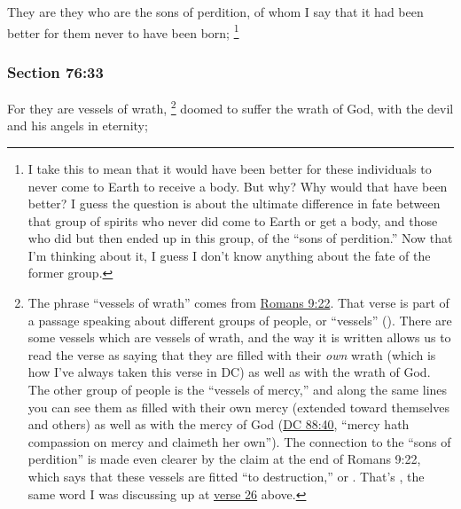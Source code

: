 		They are they who are the sons of perdition, of whom I say that it had been better for them never to have been born;%
		\footnote{%
			I take this to mean that it would have been better for these individuals to never come to Earth to receive a body. But why? Why would that have been better? I guess the question is about the ultimate difference in fate between that group of spirits who never did come to Earth or get a body, and those who did but then ended up in this group, of the ``sons of perdition.'' Now that I'm thinking about it, I guess I don't know anything about the fate of the former group.
			} 


	\subsubsection{Section 76:33} %
		\label{DC76-33}

		For they are vessels of wrath,%
			\footnote{%
				The phrase ``vessels of wrath'' comes from \hyperref[ROMANS-9-22]{Romans 9:22}. That verse is part of a passage speaking about different groups of people, or ``vessels'' (). There are some vessels which are vessels of wrath, and the way it is written allows us to read the verse as saying that they are filled with their \textit{own} wrath (which is how I've always taken this verse in DC) as well as with the wrath of God. The other group of people is the ``vessels of mercy,'' and along the same lines you can see them as filled with their own mercy (extended toward themselves and others) as well as with the mercy of God (\hyperref[DC88-40]{DC 88:40}, ``mercy hath compassion on mercy and claimeth her own''). The connection to the ``sons of perdition'' is made even clearer by the claim at the end of Romans 9:22, which says that these vessels are fitted ``to destruction,'' or . That's \hyperref[APOLEIA]{}, the same word I was discussing up at \hyperref[DC76-26]{verse 26} above.
				}
		doomed to suffer the wrath of God, with the devil and his angels in eternity;

